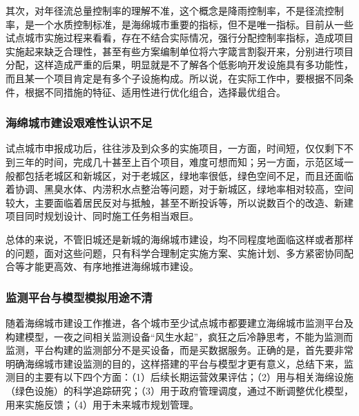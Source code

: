 \documentclass[]{book}
\begin{document}
其次，对年径流总量控制率的理解不准，这个概念是降雨控制率，不是径流控制率，是一个水质控制标准，是海绵城市重要的指标，但不是唯一指标。目前从一些试点城市实施过程来看看，存在不结合实际情况，强行分配控制率指标，造成项目实施起来缺乏合理性，甚至有些方案编制单位将六字箴言割裂开来，分别进行项目分配，这样造成严重的后果，明显就是不了解各个低影响开发设施具有多功能性，而且某一个项目肯定是有多个子设施构成。所以说，在实际工作中，要根据不同条件，根据不同措施的特征、适用性进行优化组合，选择最优组合。

\hypertarget{ux6d77ux7ef5ux57ceux5e02ux5efaux8bbeux8270ux96beux6027ux8ba4ux8bc6ux4e0dux8db3}{%
\subsubsection{海绵城市建设艰难性认识不足}\label{ux6d77ux7ef5ux57ceux5e02ux5efaux8bbeux8270ux96beux6027ux8ba4ux8bc6ux4e0dux8db3}}

试点城市申报成功后，往往涉及到众多的实施项目，一方面，时间短，仅仅剩下不到三年的时间，完成几十甚至上百个项目，难度可想而知；另一方面，示范区域一般都包括老城区和新城区，对于老城区，绿地率很低，绿色空间不足，而且还面临着协调、黑臭水体、内涝积水点整治等问题，对于新城区，绿地率相对较高，空间较大，主要面临着居民反对与抵触，甚至不断投诉等，所以说数百个的改造、新建项目同时规划设计、同时施工任务相当艰巨。

总体的来说，不管旧城还是新城的海绵城市建设，均不同程度地面临这样或者那样的问题，面对这些问题，只有科学合理制定实施方案、实施计划、多方紧密协同配合等才能更高效、有序地推进海绵城市建设。

\hypertarget{ux76d1ux6d4bux5e73ux53f0ux4e0eux6a21ux578bux6a21ux62dfux7528ux9014ux4e0dux6e05}{%
\subsubsection{监测平台与模型模拟用途不清}\label{ux76d1ux6d4bux5e73ux53f0ux4e0eux6a21ux578bux6a21ux62dfux7528ux9014ux4e0dux6e05}}

随着海绵城市建设工作推进，各个城市至少试点城市都要建立海绵城市监测平台及构建模型，一夜之间相关监测设备``风生水起''，疯狂之后冷静思考，不能为监测而监测，平台构建的监测部分不是买设备，而是买数据服务。正确的是，首先要非常明确海绵城市建设监测的目的，这样搭建的平台与模型才更有意义，总结下来，监测目的主要有以下四个方面：（1）后续长期运营效果评估；（2）用与相关海绵设施（绿色设施）的科学追踪研究；（3）用于政府管理调度，通过不断调整优化模型，用来实施反馈；（4）用于未来城市规划管理。
\end{document}
